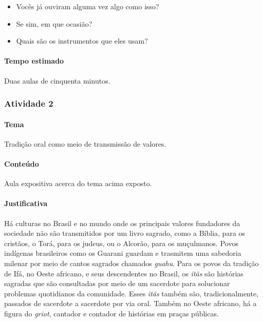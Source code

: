 \documentclass[11pt]{extarticle}
\begin{document}
\begin{itemize}
\item Vocês já ouviram alguma vez algo como isso?
\item Se sim, em que ocasião?
\item Quais são os instrumentos que eles usam?
\end{itemize}

\paragraph{Tempo estimado} Duas aulas de cinquenta minutos.



\subsubsection{Atividade 2} 

\paragraph{Tema} Tradição oral como meio de transmissão de valores.

\paragraph{Conteúdo} Aula expositiva acerca do tema acima exposto. 

\paragraph{Justificativa} Há culturas no Brasil e no mundo onde os principais valores fundadores
da sociedade não são transmitidos por um livro sagrado, como a Bíblia, para os cristãos, 
o Torá, para os judeus, ou o Alcorão, para os muçulmanos. Povos indígenas brasileiros 
como os Guarani guardam e trasmitem uma sabedoria milenar por meio de cantos
sagrados chamados \textit{guahu}. Para os povos da tradição de Ifá, no Oeste africano,
e seus descendentes no Brasil, os \textit{itãs} são histórias sagradas que são consultadas
por meio de um sacerdote para solucionar problemas quotidianos da comunidade. 
Esses \textit{itãs} também são, tradicionalmente, passados de sacerdote a sacerdote 
por via oral. Também no Oeste africano, há a figura do \textit{griot}, cantador e contador de histórias
em praças públicas. 

\end{document}
